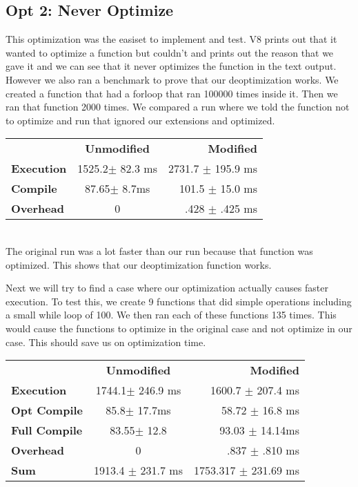 \documentclass[twocolumn,showpacs,%
  nofootinbib,aps,superscriptaddress,%
  eqsecnum,prd,notitlepage,showkeys,10pt]{revtex4-1}
\begin{document}
\subsection{Opt 2: Never Optimize}
This optimization was the easiset to implement and test. V8 prints out that it wanted to optimize a function but couldn't and prints out the reason that we gave it and we can see that it never optimizes the function in the text output. However we also ran a benchmark to prove that our deoptimization works. We created a function that had a forloop that ran 100000 times inside it. Then we ran that function 2000 times. We compared a run where we told the function not to optimize and run that ignored our extensions and optimized.\\ 


\begin{tabular}{ l c r }
  & \textbf{Unmodified} & \textbf{Modified} \\
\textbf{Execution} &  1525.2$\pm$ 82.3 ms &  2731.7 $\pm$ 195.9 ms \\
\textbf{Compile} & 87.65$\pm$ 8.7ms & 101.5 $\pm$ 15.0 ms \\
\textbf{Overhead} &  0   &   .428 $\pm$ .425 ms  \\
\end{tabular}\\

The original run was a lot faster than our run because that function was optimized. This shows that our deoptimization function works.

Next we will try to find a case where our optimization actually causes faster execution. To test this, we create 9 functions that did simple operations including a small while loop of 100. We then ran each of these functions 135 times. This would cause the functions to optimize in the original case and not optimize in our case. This should save us on optimization time.\\

\begin{tabular}{ l c r }
  & \textbf{Unmodified} & \textbf{Modified} \\
\textbf{Execution} &  1744.1$\pm$ 246.9 ms &  1600.7 $\pm$ 207.4 ms \\
\textbf{Opt Compile} & 85.8$\pm$  17.7ms & 58.72 $\pm$ 16.8 ms \\
\textbf{Full Compile} &  83.55$\pm$ 12.8 & 93.03 $\pm$ 14.14ms\\ 
\textbf{Overhead} &  0   &   .837 $\pm$ .810 ms  \\
\textbf{Sum} & 1913.4 $\pm$ 231.7 ms & 1753.317 $\pm$ 231.69 ms \\
\end{tabular}\\
\end{document}
